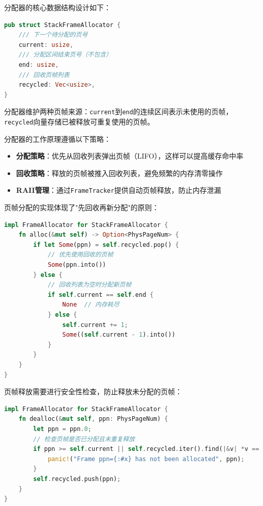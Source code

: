分配器的核心数据结构设计如下：

\begin{lstlisting}[language=Rust,caption={栈式页帧分配器结构}, label={lst:frame-allocator-struct}]
pub struct StackFrameAllocator {
    /// 下一个待分配的页号
    current: usize,
    /// 分配区间结束页号（不包含）
    end: usize,
    /// 回收页帧列表
    recycled: Vec<usize>,
}
\end{lstlisting}

分配器维护两种页帧来源：\lstinline[language=Rust]{current}到\lstinline[language=Rust]{end}的连续区间表示未使用的页帧，\lstinline[language=Rust]{recycled}向量存储已被释放可重复使用的页帧。

分配器的工作原理遵循以下策略：

\begin{itemize}
    \item \textbf{分配策略}：优先从回收列表弹出页帧（LIFO），这样可以提高缓存命中率
    \item \textbf{回收策略}：释放的页帧被推入回收列表，避免频繁的内存清零操作
    \item \textbf{RAII管理}：通过\lstinline[language=Rust]{FrameTracker}提供自动页帧释放，防止内存泄漏
\end{itemize}

页帧分配的实现体现了"先回收再新分配"的原则：

\begin{lstlisting}[language=Rust,caption={页帧分配逻辑}, label={lst:frame-alloc-logic}]
impl FrameAllocator for StackFrameAllocator {
    fn alloc(&mut self) -> Option<PhysPageNum> {
        if let Some(ppn) = self.recycled.pop() {
            // 优先使用回收的页帧
            Some(ppn.into())
        } else {
            // 回收列表为空时分配新页帧
            if self.current == self.end {
                None  // 内存耗尽
            } else {
                self.current += 1;
                Some((self.current - 1).into())
            }
        }
    }
}
\end{lstlisting}

页帧释放需要进行安全性检查，防止释放未分配的页帧：

\begin{lstlisting}[language=Rust,caption={页帧释放逻辑}, label={lst:frame-dealloc-logic}]
impl FrameAllocator for StackFrameAllocator {
    fn dealloc(&mut self, ppn: PhysPageNum) {
        let ppn = ppn.0;
        // 检查页帧是否已分配且未重复释放
        if ppn >= self.current || self.recycled.iter().find(|&v| *v == ppn).is_some() {
            panic!("Frame ppn={:#x} has not been allocated", ppn);
        }
        self.recycled.push(ppn);
    }
}
\end{lstlisting}

